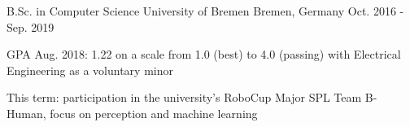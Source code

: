 

\begin{cventries}

  \cventry
    {B.Sc. in Computer Science} %
    {University of Bremen} %
    {Bremen, Germany} %
    {Oct. 2016 - Sep. 2019} %
    {
      \begin{cvitems} %
        \item {GPA Aug. 2018: 1.22 on a scale from 1.0 (best) to 4.0 (passing) with Electrical Engineering as a voluntary minor}
        \item {This term: participation in the university's RoboCup Major SPL Team B-Human, focus on perception and machine learning}
      \end{cvitems}
    }
    
\begin{comment}
  \cventry
    {Abitur} %
    {Gymnasium Damme} %
    {Damme, Germany} %
    {Jul. 2007 - Jul. 2015} %
    {
      \begin{cvitems} %
        \item {GPA: 1.8 on a scale from 1.0 (best) to 4.0 (passing) with scientific profile (Physics, Math, English, Geography, Computer Science)}
        \item {Participated in the robotics club}
      \end{cvitems}
    }
\end{comment}
\end{cventries}
